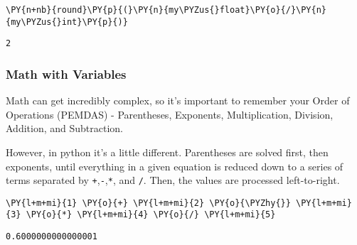     \begin{tcolorbox}[breakable, size=fbox, boxrule=1pt, pad at break*=1mm,colback=cellbackground, colframe=cellborder]
\begin{Verbatim}[commandchars=\\\{\}]
\PY{n+nb}{round}\PY{p}{(}\PY{n}{my\PYZus{}float}\PY{o}{/}\PY{n}{my\PYZus{}int}\PY{p}{)}
\end{Verbatim}
\end{tcolorbox}

            \begin{tcolorbox}[breakable, size=fbox, boxrule=.5pt, pad at break*=1mm, opacityfill=0]
\begin{Verbatim}[commandchars=\\\{\}]
2
\end{Verbatim}
\end{tcolorbox}
        
    \hypertarget{math-with-variables}{%
\subsubsection{Math with Variables}\label{math-with-variables}}

Math can get incredibly complex, so it's important to remember your
Order of Operations (PEMDAS) - Parentheses, Exponents, Multiplication,
Division, Addition, and Subtraction.

However, in python it's a little different. Parentheses are solved
first, then exponents, until everything in a given equation is reduced
down to a series of terms separated by \texttt{+},\texttt{-},\texttt{*},
and \texttt{/}. Then, the values are processed left-to-right.

    \begin{tcolorbox}[breakable, size=fbox, boxrule=1pt, pad at break*=1mm,colback=cellbackground, colframe=cellborder]
\begin{Verbatim}[commandchars=\\\{\}]
\PY{l+m+mi}{1} \PY{o}{+} \PY{l+m+mi}{2} \PY{o}{\PYZhy{}} \PY{l+m+mi}{3} \PY{o}{*} \PY{l+m+mi}{4} \PY{o}{/} \PY{l+m+mi}{5}
\end{Verbatim}
\end{tcolorbox}

            \begin{tcolorbox}[breakable, size=fbox, boxrule=.5pt, pad at break*=1mm, opacityfill=0]
\begin{Verbatim}[commandchars=\\\{\}]
0.6000000000000001
\end{Verbatim}
\end{tcolorbox}
        
